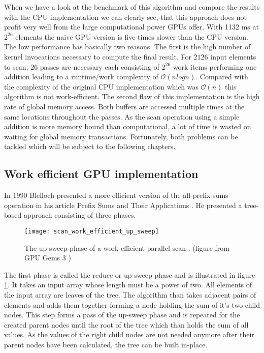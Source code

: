 When we have a look at the benchmark of this algorithm and compare the results with the CPU implementation we can clearly see, that this approach does not profit very well from the large computational power GPUs offer. With 1132 ms at $2^{26}$ elements the naive GPU version is five times slower than the CPU version. The low performance has basically two reasons. The first is the high number of kernel invocations necessary to compute the final result. For $21{26}$ input elements to scan, 26 passes are necessary each consisting of $2^{26}$ work items performing one addition leading to a runtime/work complexity of $\mathcal{O}(n log n)$. Compared with the complexity of the original CPU implementation which was $\mathcal{O}(n)$ this algorithm is not work-efficient. The second flaw of this implementation is the high rate of global memory access. Both buffers are accessed multiple times at the same locations throughout the passes. As the scan operation using a simple addition is more memory bound than computational, a lot of time is wasted on waiting for global memory transactions.
Fortunately, both problems can be tackled which will be subject to the following chapters.


\subsection{Work efficient GPU implementation}
\label{sec:scan_work_efficient}

In 1990 Blelloch presented a more efficient version of the all-prefix-sums operation in his article Prefix Sums and Their Applications \cite{scan_blelloch}. He presented a tree-based approach consisting of three phases.

\begin{figure}
\centering
\texttt{[image: scan\_work\_efficient\_up\_sweep]}
\caption{The up-sweep phase of a work efficient parallel scan \cite{scan_blelloch}.  (figure from GPU Gems 3 \cite{gpu_gems_3_chapter_39})}
\label{fig:scan_work_efficient_up_sweep}
\end{figure}

The first phase is called the reduce or up-sweep phase and is illustrated in figure \ref{fig:scan_work_efficient_up_sweep}. It takes an input array whose length must be a power of two. All elements of the input array are leaves of the tree. The algorithm than takes adjacent pairs of elements and adds them together forming a node holding the sum of it's two child nodes. This step forms a pass of the up-sweep phase and is repeated for the created parent nodes until the root of the tree which than holds the sum of all values. As the values of the right child nodes are not needed anymore after their parent nodes have been calculated, the tree can be built in-place.

